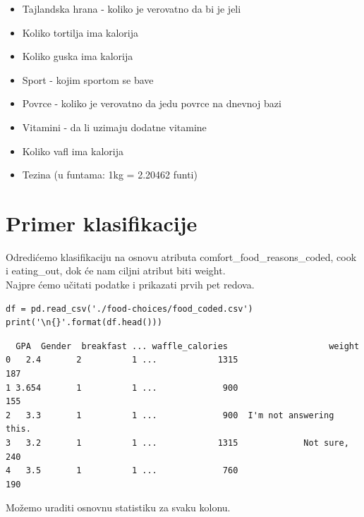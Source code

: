 \documentclass[12pt,a4paper]{article}
\begin{document}
\begin{itemize}
  \item Tajlandska hrana - koliko je verovatno da bi je jeli\\
  \item Koliko tortilja ima kalorija\\
  \item Koliko guska ima kalorija\\
  \item Sport - kojim sportom se bave\\
  \item Povrce - koliko je verovatno da jedu povrce na dnevnoj bazi\\
  \item Vitamini - da li uzimaju dodatne vitamine\\
  \item Koliko vafl ima kalorija\\
  \item Tezina (u funtama: 1kg = 2.20462 funti)\\
\end{itemize}

\section{Primer klasifikacije}

Odredi\' cemo klasifikaciju na osnovu atributa comfort\_food\_reasons\_coded, cook i eating\_out, dok \' ce nam ciljni atribut biti weight.\\

Najpre \' cemo u\v citati podatke i prikazati prvih pet redova.\\

\begin{lstlisting}[mathescape=true]
df = pd.read_csv('./food-choices/food_coded.csv')
print('\n{}'.format(df.head()))
\end{lstlisting}

\begin{verbatim}
  GPA  Gender  breakfast ... waffle_calories                    weight
0   2.4       2          1 ...            1315                       187
1 3.654       1          1 ...             900                       155
2   3.3       1          1 ...             900  I'm not answering this.
3   3.2       1          1 ...            1315             Not sure, 240
4   3.5       1          1 ...             760                       190
\end{verbatim}

Mo\v zemo uraditi osnovnu statistiku za svaku kolonu.
\end{document}
